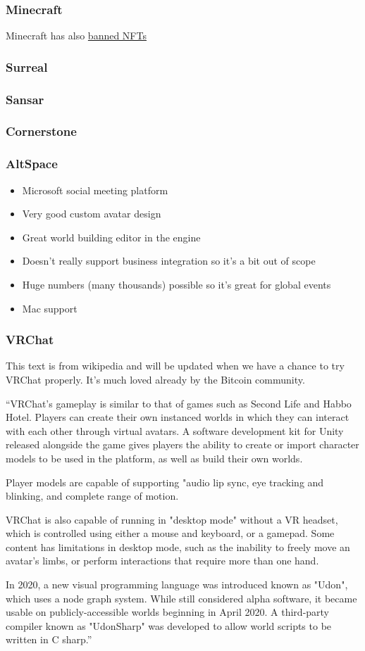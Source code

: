 \subsubsection{Minecraft}
Minecraft has also \href{https://www.minecraft.net/en-us/article/minecraft-and-nfts}{banned NFTs}
\subsubsection{Surreal}
\subsubsection{Sansar}
\subsubsection{Cornerstone}
\subsubsection{AltSpace}
\begin{itemize}
\item Microsoft social meeting platform
\item Very good custom avatar design
\item Great world building editor in the engine
\item Doesn't really support business integration so it's a bit out of scope
\item Huge numbers (many thousands) possible so it's great for global events
\item Mac support
\end{itemize}
\subsubsection{VRChat}
This text is from wikipedia and will be updated when we have a chance to try VRChat properly. It's much loved already by the Bitcoin community.\par
``VRChat's gameplay is similar to that of games such as Second Life and Habbo Hotel. Players can create their own instanced worlds in which they can interact with each other through virtual avatars. A software development kit for Unity released alongside the game gives players the ability to create or import character models to be used in the platform, as well as build their own worlds.\par
Player models are capable of supporting "audio lip sync, eye tracking and blinking, and complete range of motion.\par
VRChat is also capable of running in "desktop mode" without a VR headset, which is controlled using either a mouse and keyboard, or a gamepad. Some content has limitations in desktop mode, such as the inability to freely move an avatar's limbs, or perform interactions that require more than one hand.\par
In 2020, a new visual programming language was introduced known as "Udon", which uses a node graph system. While still considered alpha software, it became usable on publicly-accessible worlds beginning in April 2020. A third-party compiler known as "UdonSharp" was developed to allow world scripts to be written in C sharp.'' 
